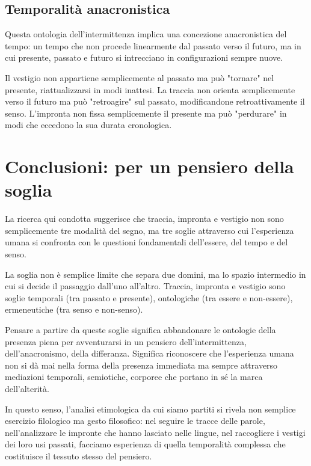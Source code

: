 \documentclass{gs}
\begin{document}
\subsection{Temporalità anacronistica}

Questa ontologia dell'intermittenza implica una concezione anacronistica del tempo: un tempo che non procede linearmente dal passato verso il futuro, ma in cui presente, passato e futuro si intrecciano in configurazioni sempre nuove.

Il vestigio non appartiene semplicemente al passato ma può "tornare" nel presente, riattualizzarsi in modi inattesi. La traccia non orienta semplicemente verso il futuro ma può "retroagire" sul passato, modificandone retroattivamente il senso. L'impronta non fissa semplicemente il presente ma può "perdurare" in modi che eccedono la sua durata cronologica.

\section{Conclusioni: per un pensiero della soglia}

La ricerca qui condotta suggerisce che traccia, impronta e vestigio non sono semplicemente tre modalità del segno, ma tre soglie attraverso cui l'esperienza umana si confronta con le questioni fondamentali dell'essere, del tempo e del senso.

La soglia non è semplice limite che separa due domini, ma lo spazio intermedio in cui si decide il passaggio dall'uno all'altro. Traccia, impronta e vestigio sono soglie temporali (tra passato e presente), ontologiche (tra essere e non-essere), ermeneutiche (tra senso e non-senso).

Pensare a partire da queste soglie significa abbandonare le ontologie della presenza piena per avventurarsi in un pensiero dell'intermittenza, dell'anacronismo, della differanza. Significa riconoscere che l'esperienza umana non si dà mai nella forma della presenza immediata ma sempre attraverso mediazioni temporali, semiotiche, corporee che portano in sé la marca dell'alterità.

In questo senso, l'analisi etimologica da cui siamo partiti si rivela non semplice esercizio filologico ma gesto filosofico: nel seguire le tracce delle parole, nell'analizzare le impronte che hanno lasciato nelle lingue, nel raccogliere i vestigi dei loro usi passati, facciamo esperienza di quella temporalità complessa che costituisce il tessuto stesso del pensiero.

\clearpage

\nocite{*}
\printbibliography
\end{document}

